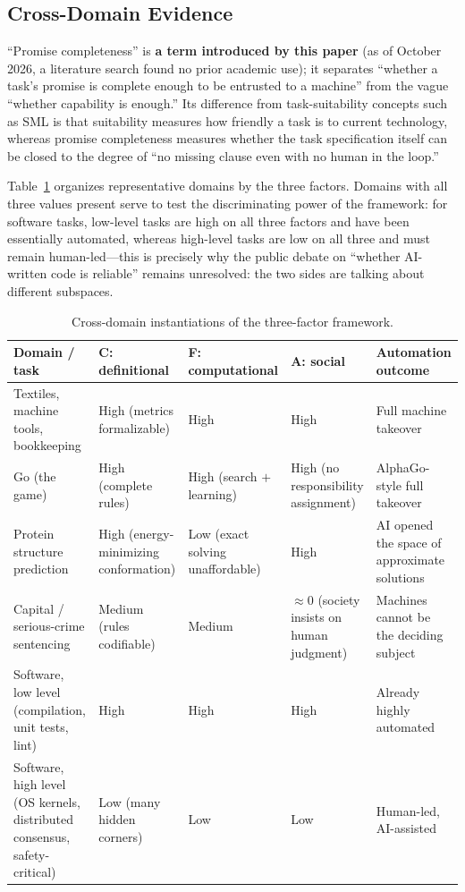 \documentclass[11pt]{article}
\begin{document}
\subsection{Cross-Domain Evidence}
``Promise completeness'' is \textbf{a term introduced by this paper} (as of
October 2026, a literature search found no prior academic use); it separates
``whether a task's promise is complete enough to be entrusted to a
machine'' from the vague ``whether capability is enough.'' Its difference
from task-suitability concepts such as SML
\cite{sml_aea,sml_science} is that suitability measures how friendly a task
is to current technology, whereas promise completeness measures whether the
task specification itself can be closed to the degree of ``no missing
clause even with no human in the loop.''

Table~\ref{tab:domains} organizes representative domains by the three
factors. Domains with all three values present serve to test the
discriminating power of the framework: for software tasks, low-level tasks
are high on all three factors and have been essentially automated, whereas
high-level tasks are low on all three and must remain human-led---this is
precisely why the public debate on ``whether AI-written code is reliable''
remains unresolved: the two sides are talking about different subspaces.

\begin{table}[t]
\centering
\small
\setlength{\tabcolsep}{3.5pt}
\begin{tabular}{p{4.0cm}p{2.6cm}p{2.2cm}p{2.9cm}p{3.0cm}}
\toprule
\textbf{Domain / task} & \textbf{C: definitional} &
\textbf{F: computational} & \textbf{A: social} &
\textbf{Automation outcome} \\
\midrule
Textiles, machine tools, bookkeeping & High (metrics formalizable) &
High & High & Full machine takeover \\
Go (the game) & High (complete rules) & High (search $+$ learning) &
High (no responsibility assignment) & AlphaGo-style full takeover
\cite{alphago} \\
Protein structure prediction & High (energy-minimizing conformation) &
Low (exact solving unaffordable) & High & AI opened the space of
approximate solutions \cite{alphafold} \\
Capital / serious-crime sentencing & Medium (rules codifiable) & Medium &
$\approx$0 (society insists on human judgment) & Machines cannot be the
deciding subject \\
Software, low level (compilation, unit tests, lint) & High & High & High &
Already highly automated \\
Software, high level (OS kernels, distributed consensus, safety-critical) &
Low (many hidden corners) & Low & Low & Human-led, AI-assisted \\
\bottomrule
\end{tabular}
\caption{Cross-domain instantiations of the three-factor framework.}
\label{tab:domains}
\end{table}
\end{document}
